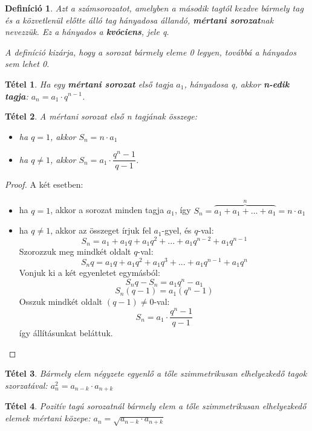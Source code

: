 \documentclass[12pt,a4paper]{article}
\newtheorem{theorem}{Tétel} [section]
\newtheorem{definition}{Definíció} [section]
\begin{document}
\begin{definition}
Azt a számsorozatot, amelyben a második tagtól kezdve bármely tag és a közvetlenül előtte álló tag hányadosa állandó, \textbf{mértani sorozat}nak nevezzük. Ez a hányados a \textbf{kvóciens}, jele q.

A definíció kizárja, hogy a sorozat bármely eleme 0 legyen, továbbá a hányados sem lehet 0.
\end{definition}

\begin{theorem}
Ha egy \textbf{mértani sorozat} első tagja $a_1$, hányadosa q, akkor \textbf{n-edik tagja}: $a_n=a_1\cdot q^{n-1}$.
\end{theorem}
\begin{theorem}
A mértani sorozat első n tagjának összege:
\begin{itemize}
\item ha $q=1$, akkor $S_n=n\cdot a_1$
\item ha $q\neq 1$, akkor $S_n=a_1\cdot \dfrac{q^{n}-1}{q-1}$.
\end{itemize}
\end{theorem}

\begin{proof}
A két esetben:
\begin{itemize}
\item ha $q=1$, akkor a sorozat minden tagja $a_1$, így $S_n=\overbrace{a_1+a_1+...+a_1}^{n}=n\cdot a_1$
\item ha $q\neq 1$, akkor az összeget írjuk fel $a_1$-gyel, és $q$-val:
$$S_n=a_1+a_1q+a_1q^{2}+...+a_1q^{n-2}+a_1q^{n-1}$$
Szorozzuk meg mindkét oldalt $q$-val:
$$S_nq=a_1q+a_1q^2+a_1q^{3}+...+a_1q^{n-1}+a_1q^{n}$$
Vonjuk ki a két egyenletet egymásból:
$$S_nq-S_n=a_1q^{n}-a_1$$
$$S_n(q-1)=a_1(q^n-1)$$
Osszuk mindkét oldalt $(q - 1) \neq 0$-val:
$$S_n=a_1\cdot \dfrac{q^{n}-1}{q-1}$$
így állításunkat beláttuk.
\end{itemize}
\end{proof}

\begin{theorem}
Bármely elem négyzete egyenlő a tőle szimmetrikusan elhelyezkedő tagok szorzatával: $a_n^2=a_{n-k}\cdot a_{n+k}$
\end{theorem}

\begin{theorem}
Pozitív tagú sorozatnál bármely elem a tőle szimmetrikusan elhelyezkedő elemek mértani közepe: $a_n=\sqrt{a_{n-k}\cdot a_{n+k}}$
\end{theorem}
\end{document}
